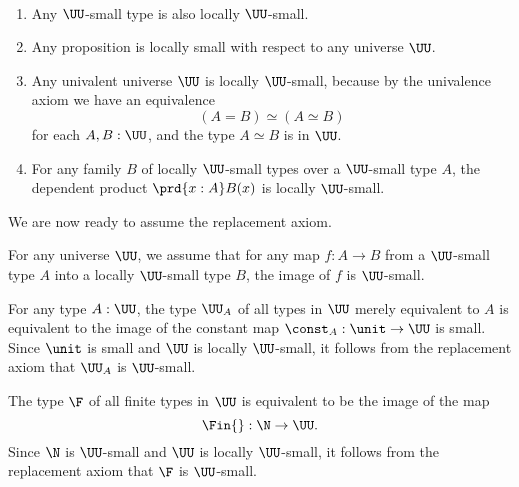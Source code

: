 \begin{eg}
  ~
  \begin{enumerate}
  \item Any $\UU$-small type is also locally $\UU$-small.
  \item Any proposition is locally small with respect to any universe $\UU$.
  \item Any univalent universe $\UU$ is locally $\UU$-small, because by the univalence axiom we have an equivalence
    \begin{equation*}
      (A=B)\simeq (A\simeq B)
    \end{equation*}
    for each $A,B:\UU$, and the type $A\simeq B$ is in $\UU$.
  \item For any family $B$ of locally $\UU$-small types over a $\UU$-small type $A$, the dependent product $\prd{x:A}B(x)$ is locally $\UU$-small.
  \end{enumerate}
\end{eg}

We are now ready to assume the replacement axiom.

\begin{axiom}\label{axiom:replacement}
  For any universe $\UU$, we assume that for any map $f:A\to B$ from a $\UU$-small type $A$ into a locally $\UU$-small type $B$, the image of $f$ is $\UU$-small.
\end{axiom}

\begin{eg}
  For any type $A:\UU$, the type $\UU_A$ of all types in $\UU$ merely equivalent to $A$ is equivalent to the image of the constant map $\const_A:\unit\to \UU$ is small. Since $\unit$ is small and $\UU$ is locally $\UU$-small, it follows from the replacement axiom that $\UU_A$ is $\UU$-small.
\end{eg}

\begin{eg}
  The type $\F$ of all finite types in $\UU$ is equivalent to be the image of the map
  \begin{equation*}
    \Fin{} : \N\to\UU.
  \end{equation*}
  Since $\N$ is $\UU$-small and $\UU$ is locally $\UU$-small, it follows from the replacement axiom that $\F$ is $\UU$-small.
\end{eg}

